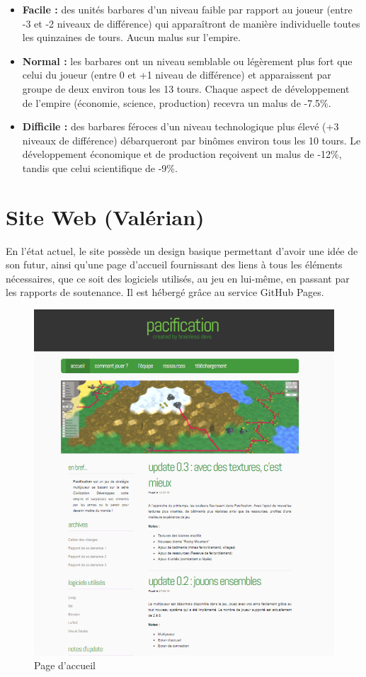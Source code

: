 \documentclass[12pt]{report}
\begin{document}
\begin{itemize}[label=\textbullet]
    \item \textbf{Facile :} des unités barbares d'un niveau faible par rapport au joueur (entre -3 et -2 niveaux de différence) qui apparaîtront de manière individuelle toutes les quinzaines de tours. Aucun malus sur l'empire.
    \item \textbf{Normal :} les barbares ont un niveau semblable ou légèrement plus fort que celui du joueur (entre 0 et +1 niveau de différence) et apparaissent par groupe de deux environ tous les 13 tours. Chaque aspect de développement de l'empire (économie, science, production) recevra un malus de -7.5\%.
    \item \textbf{Difficile :} des barbares féroces d'un niveau technologique plus élevé (+3 niveaux de différence) débarqueront par binômes environ tous les 10 tours. Le développement économique et de production reçoivent un malus de -12\%, tandis que celui scientifique de -9\%.
\end{itemize}

\section{Site Web (Valérian)}

En l’état actuel, le site possède un design basique permettant d’avoir une idée de son futur, ainsi qu’une page d’accueil fournissant des liens à tous les éléments nécessaires, que ce soit des logiciels utilisés, au jeu en lui-même, en passant par les rapports de soutenance. Il est hébergé grâce au service GitHub Pages.

\begin{figure}[H]
    \centering
    \includegraphics[scale=0.45]{homepage}
    \caption{Page d'accueil}
\end{figure}
\end{document}

